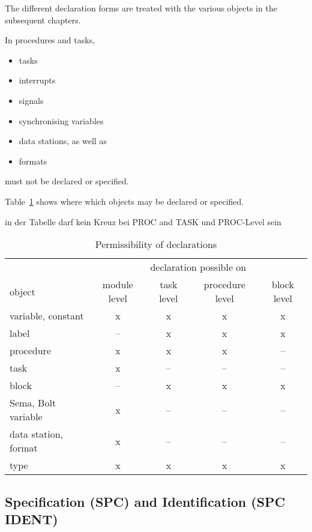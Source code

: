 The different declaration forms are treated with the various objects in
the subsequent chapters.

In procedures and tasks,
\begin{itemize}
\item tasks
\item interrupts
\item signals
\item synchronising variables
\item data stations, as well as
\item formats
\end{itemize}
must not be declared or specified.

Table~\ref{objekte} shows where which objects may be declared or
specified.

\begin{table}
\caption{Permissibility of declarations\label{objekte}}
\vspace{5mm}

\begin{discuss}
in der Tabelle darf kein Kreuz bei PROC and TASK und 
PROC-Level sein
\begin{tabular}{|l|c|c|c|c|}
\hline
                       & \multicolumn{4}{|c|}{declaration possible on} \\
object                 & module level & task level & procedure level & block level \\ \hline
variable, constant     & x            & x    & x         & x  \\
label                  & --           & x    & x         & x  \\
procedure              & x            & x    & x         & -- \\
task                   & x            & --   & --        & -- \\
block                  & --           & x    & x         & x  \\
Sema, Bolt variable    & x            & --   & --        & -- \\
data station, format   & x            & --   & --        & -- \\
type                   & x            & x    & x         & x \\
\hline
\end{tabular}
\end{discuss}
\end{table}

\subsection{Specification (SPC) and Identification (SPC IDENT)}  %

